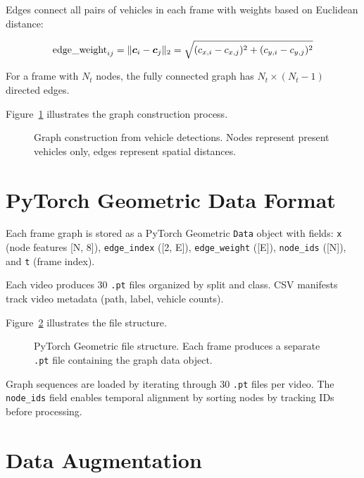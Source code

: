 Edges connect all pairs of vehicles in each frame with weights based on Euclidean distance:

\begin{equation}
    \text{edge\_weight}_{ij} = \|\bm{c}_i - \bm{c}_j\|_2 = \sqrt{(c_{x,i} - c_{x,j})^2 + (c_{y,i} - c_{y,j})^2}
\end{equation}

For a frame with $N_t$ nodes, the fully connected graph has $N_t \times (N_t - 1)$ directed edges.

Figure~\ref{fig:graph_construction} illustrates the graph construction process.

\begin{figure}[H]
    \centering
    
    \caption{Graph construction from vehicle detections. Nodes represent present vehicles only, edges represent spatial distances.}
    \label{fig:graph_construction}
\end{figure}


\section{PyTorch Geometric Data Format}

Each frame graph is stored as a PyTorch Geometric \texttt{Data} object with fields: \texttt{x} (node features [N, 8]), \texttt{edge\_index} ([2, E]), \texttt{edge\_weight} ([E]), \texttt{node\_ids} ([N]), and \texttt{t} (frame index).

Each video produces 30 \texttt{.pt} files organized by split and class. CSV manifests track video metadata (path, label, vehicle counts).

Figure~\ref{fig:hdf5_structure} illustrates the file structure.

\begin{figure}[H]
    \centering
    
    \caption{PyTorch Geometric file structure. Each frame produces a separate \texttt{.pt} file containing the graph data object.}
    \label{fig:hdf5_structure}
\end{figure}

Graph sequences are loaded by iterating through 30 \texttt{.pt} files per video. The \texttt{node\_ids} field enables temporal alignment by sorting nodes by tracking IDs before processing.

\section{Data Augmentation}

